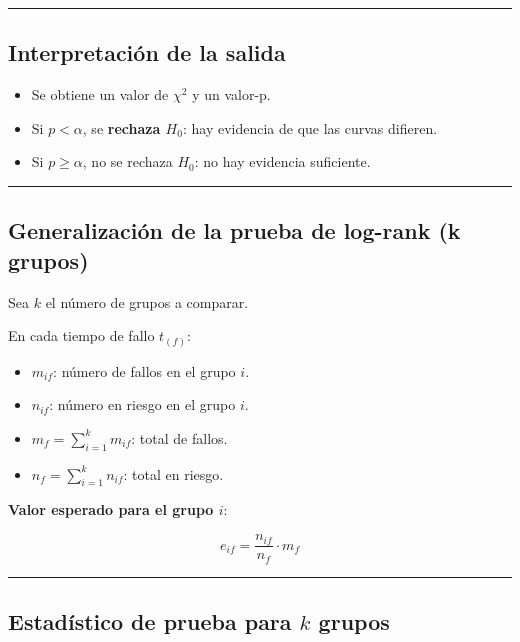 \documentclass[
]{article}
\providecommand{\tightlist}{%
  \setlength{\itemsep}{0pt}\setlength{\parskip}{0pt}}
\begin{document}
\begin{center}\rule{0.5\linewidth}{0.5pt}\end{center}

\subsection{Interpretación de la
salida}\label{interpretaciuxf3n-de-la-salida}

\begin{itemize}
\tightlist
\item
  Se obtiene un valor de \(\chi^2\) y un valor-p.
\item
  Si \(p < \alpha\), se \textbf{rechaza \(H_0\)}: hay evidencia de que
  las curvas difieren.
\item
  Si \(p \ge \alpha\), no se rechaza \(H_0\): no hay evidencia
  suficiente.
\end{itemize}

\begin{center}\rule{0.5\linewidth}{0.5pt}\end{center}

\subsection{Generalización de la prueba de log-rank (k
grupos)}\label{generalizaciuxf3n-de-la-prueba-de-log-rank-k-grupos}

Sea \(k\) el número de grupos a comparar.

En cada tiempo de fallo \(t_{(f)}\):

\begin{itemize}
\tightlist
\item
  \(m_{if}\): número de fallos en el grupo \(i\).
\item
  \(n_{if}\): número en riesgo en el grupo \(i\).
\item
  \(m_f = \sum_{i=1}^{k} m_{if}\): total de fallos.
\item
  \(n_f = \sum_{i=1}^{k} n_{if}\): total en riesgo.
\end{itemize}

\textbf{Valor esperado para el grupo \(i\)}:

\[
e_{if} = \frac{n_{if}}{n_f} \cdot m_f
\]

\begin{center}\rule{0.5\linewidth}{0.5pt}\end{center}

\subsection{\texorpdfstring{Estadístico de prueba para \(k\)
grupos}{Estadístico de prueba para k grupos}}\label{estaduxedstico-de-prueba-para-k-grupos}
\end{document}
